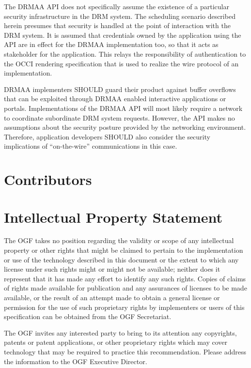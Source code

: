 \documentclass[10pt]{article}
\begin{document}
The DRMAA API does not specifically assume the existence of a particular security infrastructure in the DRM system. The scheduling scenario described herein presumes that security is handled at the point of interaction with the DRM system. It is assumed that credentials owned by the application using the API are in effect for the DRMAA implementation too, so that it acts as stakeholder for the application. This relays the responsibility of authentication to the OCCI rendering specification that is used to realize the wire protocol of an implementation.

DRMAA implementers SHOULD guard their product against buffer overflows that can be exploited through DRMAA enabled interactive applications or portals. Implementations of the DRMAA API will most likely require a network to coordinate subordinate DRM system requests. However, the API makes no assumptions about the security posture provided by the networking environment. Therefore, application developers SHOULD also consider the security implications of \enquote{on-the-wire} communications in this case.

\section{Contributors}


\section{Intellectual Property Statement}

The OGF takes no position regarding the validity or scope of any intellectual property or other rights that might be claimed to pertain to the implementation or use of the technology described in this document or the extent to which any license under such rights might or might not be available; neither does it represent that it has made any effort to identify any such rights.  Copies of claims of rights made available for publication and any assurances of licenses to be made available, or the result of an attempt made to obtain a general license or permission for the use of such proprietary rights by implementers or users of this specification can be obtained from the OGF Secretariat.

The OGF invites any interested party to bring to its attention any copyrights, patents or patent applications, or other proprietary rights which may cover technology that may be required to practice this recommendation.  Please address the information to the OGF Executive Director.
\end{document}
